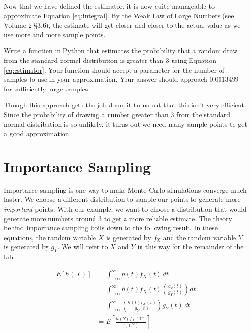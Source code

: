 Now that we have defined the estimator, it is now quite manageable to approximate Equation \ref{eq:integral}. By the Weak Law of Large Numbers (see Volume 2 \S 3.6), the estimate will get closer and closer to the actual value as we use more and more sample points.

\begin{problem} \label{prob:mc}
Write a function in Python that estimates the probability that a random draw from the standard normal distribution is greater than 3 using Equation \ref{eq:estimator}. Your function should accept a parameter  for the number of samples to use in your approximation. Your answer should approach $0.0013499$ for sufficiently large samples.
\end{problem}

Though this approach gets the job done, it turns out that this isn't very efficient. Since the probability of drawing a number greater than $3$ from the standard normal distribution is so unlikely, it turns out we need many sample points to get a good approximation.

\section*{Importance Sampling}
Importance sampling is one way to make Monte Carlo simulations converge much faster. We choose a different distribution to sample our points to generate more \emph{important} points. With our example, we want to choose a distribution that would generate more numbers around $3$ to get a more reliable estimate. The theory behind importance sampling boils down to the following result. In these equations, the random variable $X$ is generated by $f_X$ and the random variable $Y$ is generated by $g_Y$. We will refer to $X$ and $Y$ in this way for the remainder of the lab.

\begin{equation} \label{eq:importance}
\begin{split}
E[h(X)] & = \int_{-\infty}^{\infty} h(t)f_X(t)\,dt \\
& = \int_{-\infty}^{\infty} h(t)f_X(t)\left ( \frac{g_Y(t)}{g_Y(t)} \right )\,dt \\
& = \int_{-\infty}^{\infty} \left ( \frac{h(t)f_X(t)}{g_Y(t)} \right )g_Y(t)\,dt \\
& = E\left [ \frac{h(Y)f_X(Y)}{g_Y(Y)}\right ]
\end{split}
\end{equation}

